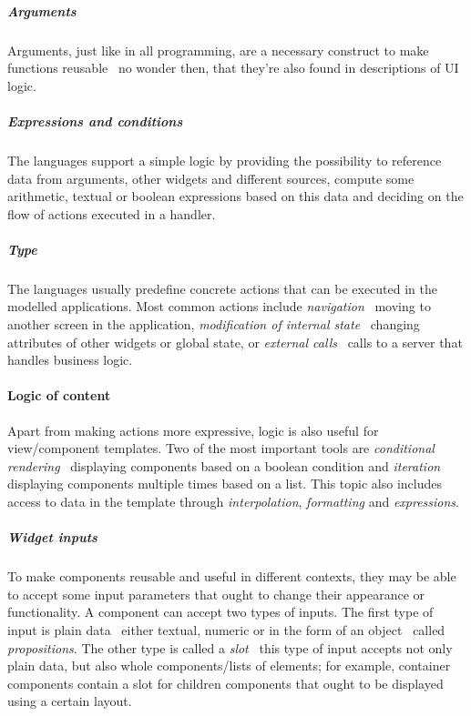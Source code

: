 \subparagraph{Arguments}
Arguments, just like in all programming, are a necessary construct to make functions reusable \textendash\ no wonder then, that they're also found in descriptions of UI logic.

\subparagraph{Expressions and conditions}
The languages support a simple logic by providing the possibility to reference data from arguments, other widgets and different sources, compute some arithmetic, textual or boolean expressions based on this data and deciding on the flow of actions executed in a handler.

\subparagraph{Type}
The languages usually predefine concrete actions that can be executed in the modelled applications.
Most common actions include \emph{navigation} \textendash\ moving to another screen in the application, \emph{modification of internal state} \textendash\ changing attributes of other widgets or global state, or \emph{external calls} \textendash\ calls to a server that handles business logic.


%

\paragraph{Logic of content}
Apart from making actions more expressive, logic is also useful for view/component templates.
Two of the most important tools are \emph{conditional rendering} \textendash\ displaying components based on a boolean condition and \emph{iteration} displaying components multiple times based on a list.
This topic also includes access to data in the template through \emph{interpolation}, \emph{formatting} and \emph{expressions}.

\subparagraph{Widget inputs}
To make components reusable and useful in different contexts, they may be able to accept some input parameters that ought to change their appearance or functionality.
A component can accept two types of inputs.
The first type of input is plain data \textendash\ either textual, numeric or in the form of an object \textendash\ called \emph{propositions}.
The other type is called a \emph{slot} \textendash\ this type of input accepts not only plain data, but also whole components/lists of elements;
for example, container components contain a slot for children components that ought to be displayed using a certain layout.

